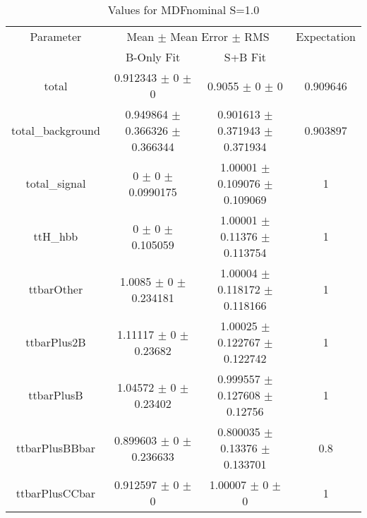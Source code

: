 \begin{table}
\centering
\caption{Values for MDFnominal S=1.0}
\begin{tabular}{cccc}
\toprule
Parameter & \multicolumn{2}{c}{Mean $\pm$ Mean Error $\pm$ RMS} & Expectation\\
 & B-Only Fit & S+B Fit & \\
\midrule
total & \num{0.912343} $\pm$ \num{0} $\pm$ \num{0} & \num{0.9055} $\pm$ \num{0} $\pm$ \num{0} & \num{0.909646}\\
total\_background & \num{0.949864} $\pm$ \num{0.366326} $\pm$ \num{0.366344} & \num{0.901613} $\pm$ \num{0.371943} $\pm$ \num{0.371934} & \num{0.903897}\\
total\_signal & \num{0} $\pm$ \num{0} $\pm$ \num{0.0990175} & \num{1.00001} $\pm$ \num{0.109076} $\pm$ \num{0.109069} & \num{1}\\
ttH\_hbb & \num{0} $\pm$ \num{0} $\pm$ \num{0.105059} & \num{1.00001} $\pm$ \num{0.11376} $\pm$ \num{0.113754} & \num{1}\\
ttbarOther & \num{1.0085} $\pm$ \num{0} $\pm$ \num{0.234181} & \num{1.00004} $\pm$ \num{0.118172} $\pm$ \num{0.118166} & \num{1}\\
ttbarPlus2B & \num{1.11117} $\pm$ \num{0} $\pm$ \num{0.23682} & \num{1.00025} $\pm$ \num{0.122767} $\pm$ \num{0.122742} & \num{1}\\
ttbarPlusB & \num{1.04572} $\pm$ \num{0} $\pm$ \num{0.23402} & \num{0.999557} $\pm$ \num{0.127608} $\pm$ \num{0.12756} & \num{1}\\
ttbarPlusBBbar & \num{0.899603} $\pm$ \num{0} $\pm$ \num{0.236633} & \num{0.800035} $\pm$ \num{0.13376} $\pm$ \num{0.133701} & \num{0.8}\\
ttbarPlusCCbar & \num{0.912597} $\pm$ \num{0} $\pm$ \num{0} & \num{1.00007} $\pm$ \num{0} $\pm$ \num{0} & \num{1}\\
\bottomrule
\end{tabular}
\end{table}